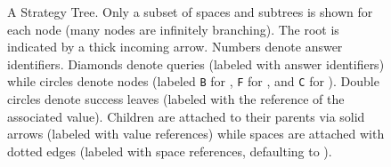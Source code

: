 \begin{figure}
  \vspace{-0.2cm}
  \caption{A Strategy Tree. Only a subset of spaces and subtrees is shown for each node (many nodes are infinitely branching). The root is indicated by a thick incoming arrow. Numbers denote answer identifiers. Diamonds denote queries (labeled with answer identifiers) while circles denote nodes (labeled \texttt{B} for , \texttt{F} for , and \texttt{C} for ). Double circles denote success leaves (labeled with the reference of the associated value). Children are attached to their parents via solid arrows (labeled with value references) while spaces are attached with dotted edges (labeled with space references, defaulting to ). }\label{fig:tree-example}
\end{figure}
